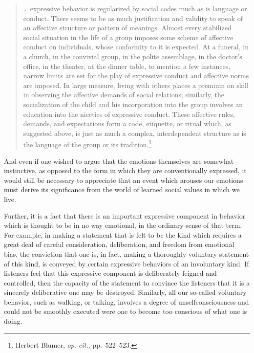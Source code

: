 \documentclass[openany,nobib]{tufte-book}
\begin{document}
\begin{quote}
\ldots{} expressive behavior is regularized by social codes much as is
language or conduct. There seems to be as much justification and
validity to speak of an affective structure or pattern of meanings.
Almost every stabilized social situation in the life of a group imposes
some scheme of affective conduct on individuals, whose conformity to it
is expected. At a funeral, in a church, in the convivial group, in the
polite assemblage, in the doctor's office, in the theater, at the dinner
table, to mention a few instances, narrow limits are set for the play of
expressive conduct and affective norms are imposed. In large measure,
living with others places a premium on skill in observing the affective
demands of social relations; similarly, the socialization of the child
and his incorporation into the group involves an education into the
niceties of expressive conduct. These affective rules, demands, and
expectations form a code, etiquette, or ritual which, as suggested
above, is just as much a complex, interdependent structure as is the
language of the group or its tradition.\footnote{Herbert Blumer,
  \emph{op. cit.}, pp.~522--523.}
\end{quote}

\noindent And even if one wished to argue that the emotions themselves are
somewhat instinctive, as opposed to the form in which they are
conventionally expressed, it would still be necessary to appreciate that
an event which arouses our emotions must derive its significance from
the world of learned social values in which we live.

Further, it is a fact that there is an important expressive component in
behavior which is thought to be in no way emotional, in the ordinary
sense of that term. For example, in making a statement that is felt to
be the kind which requires a great deal of careful consideration,
deliberation, and freedom from emotional bias, the conviction that one
is, in fact, making a thoroughly voluntary statement of this kind, is
conveyed by certain expressive behaviors of an involuntary kind. If
listeners feel that this expressive component is deliberately feigned
and controlled, then the capacity of the statement to convince the
listeners that it is a sincerely deliberative one may be destroyed.
Similarly, all our so-called voluntary behavior, such as walking, or
talking, involves a degree of unselfconsciousness and could not be
smoothly executed were one to become too conscious of what one is doing.
\end{document}
